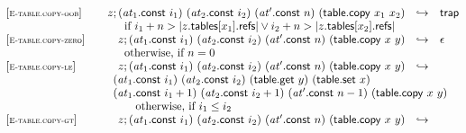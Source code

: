 \vspace{1ex}

$$
\begin{array}[t]{@{}lrcl@{}l@{}}
{[\textsc{\scriptsize E{-}table.copy{-}oob}]} \quad & z ; ({\mathit{at}}_1{.}\mathsf{const}~i_1)~({\mathit{at}}_2{.}\mathsf{const}~i_2)~({\mathit{at}'}{.}\mathsf{const}~n)~(\mathsf{table{.}copy}~x_1~x_2) & \hookrightarrow & \mathsf{trap} &  \\
& \multicolumn{4}{@{}l@{}}{\quad
\quad \mbox{if}~ i_1 + n > {|z{.}\mathsf{tables}{}[x_1]{.}\mathsf{refs}|} \lor i_2 + n > {|z{.}\mathsf{tables}{}[x_2]{.}\mathsf{refs}|}
} \\
{[\textsc{\scriptsize E{-}table.copy{-}zero}]} \quad & z ; ({\mathit{at}}_1{.}\mathsf{const}~i_1)~({\mathit{at}}_2{.}\mathsf{const}~i_2)~({\mathit{at}'}{.}\mathsf{const}~n)~(\mathsf{table{.}copy}~x~y) & \hookrightarrow & \epsilon &  \\
& \multicolumn{4}{@{}l@{}}{\quad
\quad \mbox{otherwise, if}~ n = 0
} \\
{[\textsc{\scriptsize E{-}table.copy{-}le}]} \quad & z ; ({\mathit{at}}_1{.}\mathsf{const}~i_1)~({\mathit{at}}_2{.}\mathsf{const}~i_2)~({\mathit{at}'}{.}\mathsf{const}~n)~(\mathsf{table{.}copy}~x~y) & \hookrightarrow & & \\
& \multicolumn{4}{@{}l@{}}{\quad
\begin{array}[t]{@{}l@{}l@{}l@{}}
\begin{array}[t]{@{}l@{}} ({\mathit{at}}_1{.}\mathsf{const}~i_1)~({\mathit{at}}_2{.}\mathsf{const}~i_2)~(\mathsf{table{.}get}~y)~(\mathsf{table{.}set}~x) \\
  ({\mathit{at}}_1{.}\mathsf{const}~i_1 + 1)~({\mathit{at}}_2{.}\mathsf{const}~i_2 + 1)~({\mathit{at}'}{.}\mathsf{const}~n - 1)~(\mathsf{table{.}copy}~x~y) \end{array} & & \\
 \multicolumn{3}{@{}l@{}}{\quad
\begin{array}[t]{@{}l@{}}
\quad \mbox{otherwise, if}~ i_1 \leq i_2 \\
\end{array}
} \\
\end{array}
} \\
{[\textsc{\scriptsize E{-}table.copy{-}gt}]} \quad & z ; ({\mathit{at}}_1{.}\mathsf{const}~i_1)~({\mathit{at}}_2{.}\mathsf{const}~i_2)~({\mathit{at}'}{.}\mathsf{const}~n)~(\mathsf{table{.}copy}~x~y) & \hookrightarrow & & \\
& \multicolumn{4}{@{}l@{}}{\quad
\begin{array}[t]{@{}l@{}l@{}l@{}}

\end{array}}
\end{array}$$

